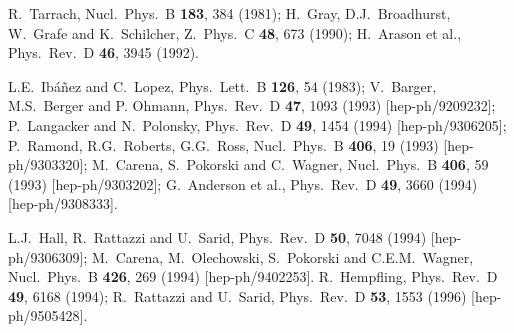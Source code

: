\documentclass[12pt]{article}
\begin{document}
\begin{thebibliography}{999}
R.~Tarrach, 
  Nucl.\ Phys.\ B {\bf 183}, 384 (1981);
H.~Gray, D.J.~Broadhurst, W.~Grafe and K.~Schilcher,
  Z.\ Phys.\ C {\bf 48}, 673 (1990);
H.~Arason et al., 
  Phys.\ Rev.\ D {\bf 46}, 3945 (1992).

L.E.~Ib\'a\~nez and C.~Lopez, 
  Phys.\ Lett.\ B {\bf 126}, 54 (1983);
V.~Barger, M.S.~Berger and P. Ohmann, 
  Phys.\ Rev.\ D {\bf 47}, 1093 (1993)
  [hep-ph/9209232];
P.~Langacker and N.~Polonsky, 
  Phys.\ Rev.\ D {\bf 49}, 1454 (1994)
  [hep-ph/9306205];
P.~Ramond, R.G.~Roberts, G.G.~Ross,
  Nucl.\ Phys.\ B {\bf 406}, 19 (1993)
  [hep-ph/9303320];
M.~Carena, S.~Pokorski and C.~Wagner,
  Nucl.\ Phys.\ B {\bf 406}, 59 (1993)
  [hep-ph/9303202];
G.~Anderson et al.,
  Phys.\ Rev.\ D {\bf 49}, 3660 (1994)
  [hep-ph/9308333].

L.J.~Hall, R.~Rattazzi and U.~Sarid,
  Phys.\ Rev.\ D {\bf 50}, 7048 (1994)
  [hep-ph/9306309];
M.~Carena, M.~Olechowski, S.~Pokorski and C.E.M.~Wagner,
  Nucl.\ Phys.\ B {\bf 426}, 269 (1994)
  [hep-ph/9402253].
R.~Hempfling, 
  Phys.\ Rev.\ D {\bf 49}, 6168 (1994);
R.~Rattazzi and U.~Sarid, 
  Phys.\ Rev.\ D {\bf 53}, 1553 (1996)
  [hep-ph/9505428].



\end{thebibliography}
\end{document}
